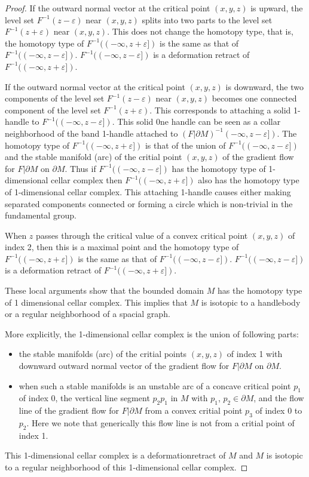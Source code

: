 \documentclass{amsart}
\numberwithin{equation}{section}
\newcommand{\bd}{\partial}
\begin{document}
\begin{proof}
If the outward normal vector at the critical point $(x,y,z)$ is upward, the level set $F^{-1}(z-\varepsilon)$ near $(x,y,z)$ splits into two parts to the level set $F^{-1}(z+\varepsilon)$ near $(x,y,z)$. This does not change the homotopy type, that is, the homotopy type of $F^{-1}((-\infty,z+\varepsilon])$ is the same as that of  $F^{-1}((-\infty,z-\varepsilon])$. $F^{-1}((-\infty,z-\varepsilon])$ is a deformation retract of $F^{-1}((-\infty,z+\varepsilon])$.

If the outward normal vector at the critical point $(x,y,z)$ is downward, the two components of the level set $F^{-1}(z-\varepsilon)$ near $(x,y,z)$ becomes one connected component of the level set $F^{-1}(z+\varepsilon)$. This corresponds to attaching a solid 1-handle to $F^{-1}((-\infty,z-\varepsilon])$. This solid 0ne handle can be seen as a collar neighborhood of the band 1-handle attached to $(F|\bd M)^{-1}(-\infty,z-\varepsilon])$. 
The homotopy type of $F^{-1}((-\infty,z+\varepsilon])$ is that of the union of 
  $F^{-1}((-\infty,z-\varepsilon])$ and the stable manifold (arc) of the critial point $(x,y,z)$ of the gradient flow for $F|\bd M$ on $\bd M$. Thus if  $F^{-1}((-\infty,z-\varepsilon])$ has the homotopy type of 1-dimensional cellar complex then  $F^{-1}((-\infty,z+\varepsilon])$ also has the homotopy type of 1-dimensional cellar complex.  This attaching 1-handle causes either making separated components connected or forming a circle which is non-trivial in the fundamental group. 

When $z$ passes through the critical value of a convex critical point $(x,y,z)$ of index 2, then this is a maximal point and the homotopy type of $F^{-1}((-\infty,z+\varepsilon])$ is the same as that of  $F^{-1}((-\infty,z-\varepsilon])$. $F^{-1}((-\infty,z-\varepsilon])$ is a deformation retract of $F^{-1}((-\infty,z+\varepsilon])$.

These local arguments show that the bounded domain $M$ has the homotopy type of 1 dimensional cellar complex. This implies that $M$ is isotopic to a handlebody or a regular neighborhood of a spacial graph. 

More explicitly, 
the 1-dimensional cellar complex is the union of following parts:
\begin{itemize}
\item 
the stable manifolds (arc) of the critial points  $(x,y,z)$ of index 1 with downward outward normal vector of the gradient flow for $F|\bd M$ on $\bd M$.
\item
when such a stable manifolds is an unstable arc of a concave critical point $p_1$ of index 0, the vertical line segment $p_2p_1$ in $M$ with $p_1$, $p_2\in \bd M$, and the flow line of the gradient flow for $F|\bd M$ from a convex critial point $p_3$ of index 0 to $p_2$. Here we note that generically this flow line is not from a critial point of index 1.
\end{itemize}

This 1-dimensional cellar complex is a deformationretract of $M$ and $M$ is isotopic to a regular neighborhood of this 1-dimensional cellar complex.
\end{proof}
\end{document}

